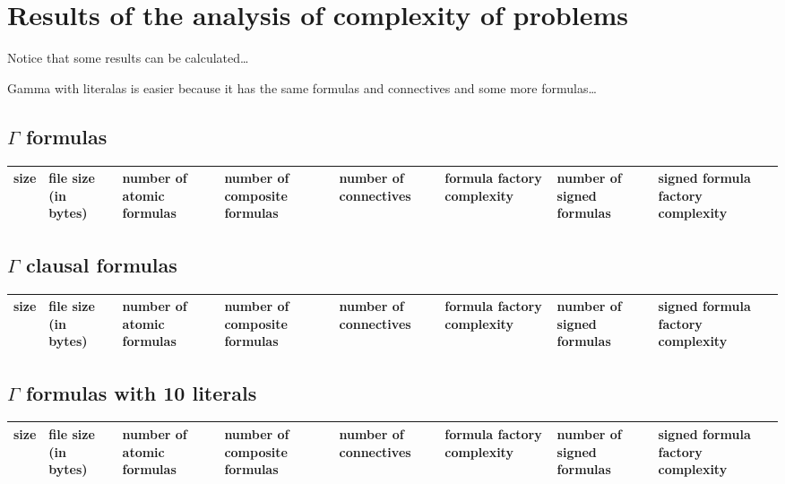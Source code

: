 \documentclass{article}
\begin{document}
\newenvironment{ctabular}
		{\begin{center}\begin{tabular}}
		{\end{tabular}\end{center}}

\section{Results of the analysis of complexity of problems}

Notice that some results can be calculated\ldots

Gamma with literalas is easier because it has the same formulas and
connectives and some more formulas\ldots
\label{tests}



\subsection{$\Gamma$ formulas}

\begin{ctabular}{|l|p{2cm}|p{2cm}|p{2cm}|p{2cm}|p{2cm}|p{2cm}|p{2cm}|} \hline
size & file size (in bytes) & number of atomic formulas & number of composite formulas & number of connectives & formula factory complexity &
number of signed formulas & signed formula factory complexity  \\ \hline

\end{ctabular}


\subsection{$\Gamma$ clausal formulas}

\begin{ctabular}{|l|p{2cm}|p{2cm}|p{2cm}|p{2cm}|p{2cm}|p{2cm}|p{2cm}|} \hline
size & file size (in bytes) & number of atomic formulas & number of composite formulas & number of connectives & formula factory complexity &
number of signed formulas & signed formula factory complexity  \\ \hline

\end{ctabular}

\subsection{$\Gamma$ formulas with 10 literals}

\begin{ctabular}{|l|p{2cm}|p{2cm}|p{2cm}|p{2cm}|p{2cm}|p{2cm}|p{2cm}|} \hline
size & file size (in bytes) & number of atomic formulas & number of composite formulas & number of connectives & formula factory complexity &
number of signed formulas & signed formula factory complexity  \\ \hline

\end{ctabular}
\end{document}
